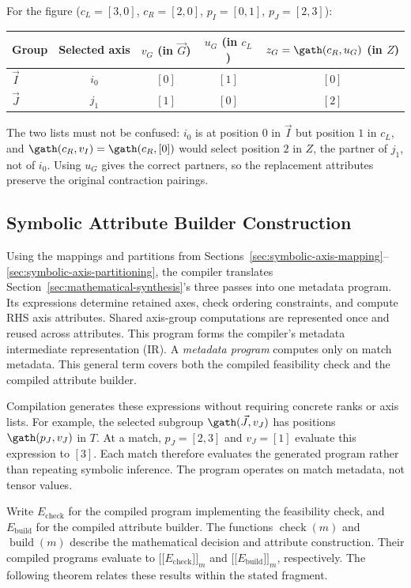 For the figure ($c_L=[3,0]$, $c_R=[2,0]$, $p_I=[0,1]$, $p_J=[2,3]$):

\begin{center}
\small
\begin{tabular}{@{}lcccc@{}}\toprule
Group & Selected axis & $v_G$ (in $\vec G$) & $u_G$ (in $c_L$) & $z_G=\gath(c_R,u_G)$ (in $Z$)\\\midrule
$\vec I$ & $i_0$ & $[0]$ & $[1]$ & $[0]$\\
$\vec J$ & $j_1$ & $[1]$ & $[0]$ & $[2]$\\\bottomrule
\end{tabular}
\end{center}

The two lists must not be confused: $i_0$ is at position $0$ in $\vec I$ but
position $1$ in $c_L$, and $\gath(c_R,v_I)=\gath(c_R,[0])$ would select
position $2$ in $Z$, the partner of $j_1$, not of $i_0$. Using $u_G$ gives the
correct partners, so the replacement attributes preserve the original
contraction pairings.

\subsection{Symbolic Attribute Builder Construction}
\label{sec:symbolic-program-construction}
Using the mappings and partitions from
Sections~\ref{sec:symbolic-axis-mapping}--\ref{sec:symbolic-axis-partitioning},
the compiler translates Section~\ref{sec:mathematical-synthesis}'s three
passes into one metadata program. Its expressions determine retained axes,
check ordering constraints, and compute RHS axis attributes. Shared
axis-group computations are represented once and reused across attributes.
This program forms the compiler's metadata intermediate representation (IR).
A \emph{metadata program} computes only on match metadata. This general
term covers both the compiled feasibility check and the compiled attribute
builder.

Compilation generates these expressions without requiring concrete ranks
or axis lists. For example, the selected subgroup $\gath(\vec J,v_J)$ has
positions $\gath(p_J,v_J)$ in $T$. At a match, $p_J=[2,3]$ and $v_J=[1]$
evaluate this expression to $[3]$. Each match therefore evaluates the
generated program rather than repeating symbolic inference. The program
operates on match metadata, not tensor values.

Write $E_{\mathrm{check}}$ for the compiled program implementing the feasibility check,
and $E_{\mathrm{build}}$ for the compiled attribute builder. The functions
$\operatorname{check}(m)$ and $\operatorname{build}(m)$ describe the
mathematical decision and attribute construction. Their compiled programs
evaluate to $\lbrack\!\lbrack E_{\mathrm{check}}\rbrack\!\rbrack_m$ and
$\lbrack\!\lbrack E_{\mathrm{build}}\rbrack\!\rbrack_m$, respectively. The following
theorem relates these results within the stated fragment.

